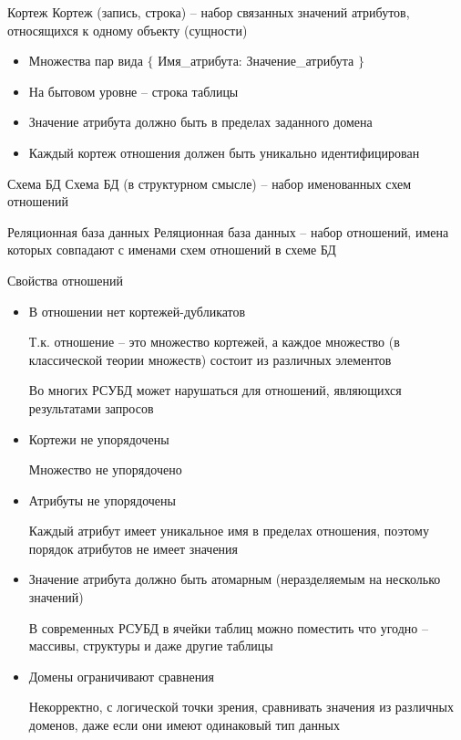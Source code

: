 \documentclass[12pt]{article}
\begin{document}
\begin{defin}{Кортеж}
    Кортеж (запись, строка) -- набор связанных значений атрибутов, относящихся к одному объекту (сущности)

    \begin{itemize}
        \item Множества пар вида $\{$ Имя\_атрибута: Значение\_атрибута $\}$
        \item На бытовом уровне -- строка таблицы 
        \item Значение атрибута должно быть в пределах заданного домена
        \item Каждый кортеж отношения должен быть уникально идентифицирован
    \end{itemize}
\end{defin}

\begin{defin}{Схема БД}
    Схема БД (в структурном смысле) -- набор именованных схем отношений 
\end{defin}

\begin{defin}{Реляционная база данных}
    Реляционная база данных -- набор отношений, имена которых совпадают с именами схем отношений в схеме БД
\end{defin}

\begin{nota}{Свойства отношений}
    \begin{itemize}
        \item В отношении нет кортежей-дубликатов
        
        Т.к. отношение -- это множество кортежей, а каждое множество (в классической теории множеств) состоит из различных элементов 

        Во многих РСУБД может нарушаться для отношений, являющихся результатами запросов

        \item Кортежи не упорядочены
        
        Множество не упорядочено

        \item Атрибуты не упорядочены 
        
        Каждый атрибут имеет уникальное имя в пределах отношения, поэтому порядок атрибутов не имеет значения 

        \item Значение атрибута должно быть атомарным (неразделяемым на несколько значений)
        
        В современных РСУБД в ячейки таблиц можно поместить что угодно -- массивы, структуры и даже другие таблицы 

        \item Домены ограничивают сравнения
        
        Некорректно, с логической точки зрения, сравнивать значения из различных доменов, даже если они имеют одинаковый тип данных 
    \end{itemize}
\end{nota}
\end{document}
